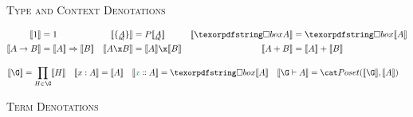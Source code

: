 \begin{figure*}
  \textsc{Type and Context Denotations}


  \begin{align*}
    \den{\tunit} &= \termO
    & \den{\tseteq A} &= \pfinof{\den{\eqt A}}
    & \den{\iso A} &= \iso{\den{A}}
    \\
    \den{A \to B} &= \expO{\den{A}}{\den{B}}
    & \den{A \x B} &= \den{A} \x \den{B}
    & \den{A + B} &= \den{A} + \den{B}
  \end{align*}

  \begin{align*}
    \den{\G} &= \prod_{H \in \G} \den{H} &
    \den{\h x A} &= \den{A} & \den{\hd x A} &= \iso{\den{A}} &
    \den{\G \vdash A} &= \Poset(\den\G, \den A)
  \end{align*}

  \textsc{Term Denotations}


\end{figure*}
